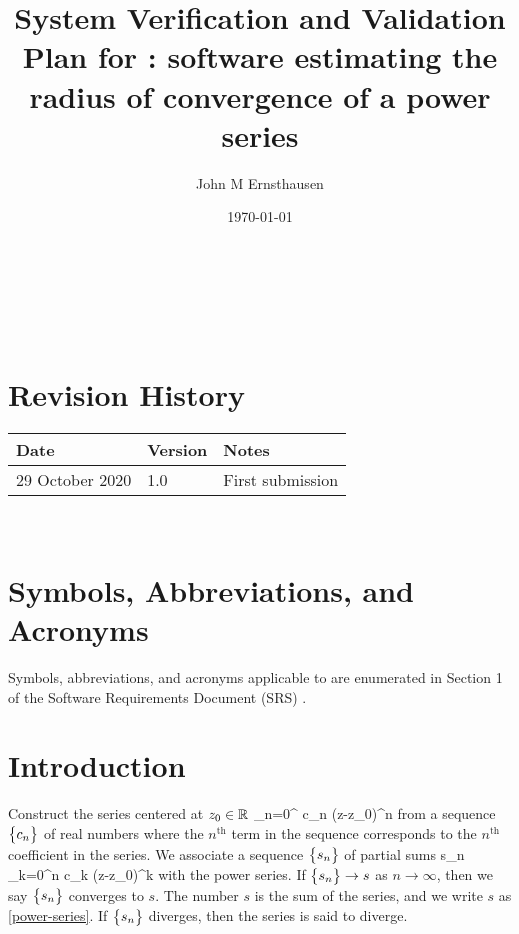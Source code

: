 \documentclass[12pt, titlepage]{article}
\begin{document}
\title{System Verification and Validation Plan for :
software estimating the radius of convergence of a power series} 
\author{John M Ernsthausen}
\date{\today}
	
\maketitle

~\newpage


\tableofcontents

\listoftables

\listoffigures

~\newpage

\section*{Revision History}

\begin{tabularx}{\textwidth}{p{3cm}p{2cm}X}
\toprule {\bf Date} & {\bf Version} & {\bf Notes}\\
\midrule
29 October 2020 & 1.0 & First submission\\
\bottomrule
\end{tabularx}

~\newpage

\section{Symbols, Abbreviations, and Acronyms}

Symbols, abbreviations, and acronyms applicable to  are enumerated
in Section 1 of the Software Requirements Document (SRS) \citep{SRS}.

\newpage


% 
% 
% 
% 
%  

\section{Introduction} \label{sc:introduction}

Construct the series centered at $z_0 \in \mathbb{R}$
\EQ
{
  \label{eq:power-series}
  \sum_{n=0}^{\infty} c_n (z-z_0)^n
}
from a sequence $\bigl\{ {c_n} \bigr\}$ of real numbers where the $n^\text{th}$ term in the sequence corresponds
to the $n^\text{th}$ coefficient in the series. We associate a sequence $\bigl\{ {s_n} \bigr\}$ of partial sums
\EQ
{
  \label{eq:partial-sum}
  s_n  \sum_{k=0}^n c_k (z-z_0)^k
}
with the power series. If $\bigl\{ {s_n} \bigr\} \rightarrow s$ as $n \rightarrow \infty$,
then we say $\bigl\{ {s_n} \bigr\}$ converges to $s$. The number $s$ is the sum of the series, and
we write $s$ as \eqref{power-series}. If $\bigl\{ {s_n} \bigr\}$ diverges, then the series is said to diverge.
\end{document}
